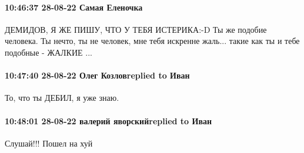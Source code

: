  
 
 
 
 

\paragraph{10:46:37 28-08-22 Самая Еленочка}

ДЕМИДОВ, Я ЖЕ ПИШУ, ЧТО У ТЕБЯ ИСТЕРИКА:-D Ты же подобие человека. Ты нечто, ты
не человек, мне тебя искренне жаль... такие как ты и тебе подобные - ЖАЛКИЕ ...

\paragraph{10:47:40 28-08-22 Олег Козловreplied to Иван}

То, что ты ДЕБИЛ, я уже знаю.

\paragraph{10:48:01 28-08-22 валерий яворскийreplied to Иван}
Слушай!!! Пошел на хуй
